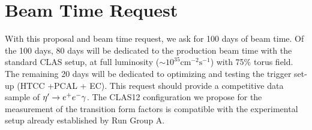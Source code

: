 \section{Beam Time Request}\label{sec:beamrequest}
With this proposal and beam time request, we ask for 100 days of beam time. Of the 100 days, 80 days will be dedicated to the production beam time with the standard CLAS setup, at full luminosity ($\sim 10^{35} \mathrm{cm^{-2}s^{-1}}$) with 75\% torus field. The remaining 20 days will be dedicated to optimizing and testing the trigger set-up (HTCC +PCAL + EC). This request should provide a competitive data sample of $\eta^{\prime} \to e^+e^- \gamma$. The CLAS12 configuration we propose for the measurement of the transition form factors is compatible with the experimental setup already established by Run Group A.